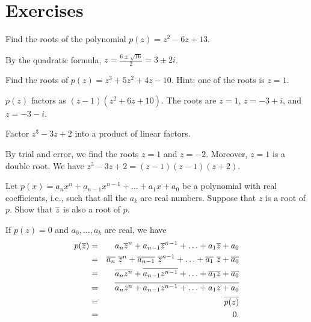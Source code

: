 \section*{Exercises}

\begin{ex}
  Find the roots of the polynomial $p(z) = z^2-6z+13$.
  \begin{sol}
    By the quadratic formula, $\displaystyle z=\frac{6\pm\sqrt{16}}{2}
      = 3\pm 2i$.
  \end{sol}
\end{ex}

\begin{ex}
  Find the roots of $p(z) = z^3 + 5z^2 + 4z - 10$. Hint: one of the
  roots is $z=1$.
  \begin{sol}
    $p(z)$ factors as $(z-1)(z^2+6z+10)$. The roots are $z=1$,
    $z=-3+i$, and $z=-3-i$.
  \end{sol}
\end{ex}

\begin{ex}
  Factor $z^3 - 3z + 2$ into a product of linear factors.
  \begin{sol}
    By trial and error, we find the roots $z=1$ and $z=-2$. Moreover,
    $z=1$ is a double root. We have $z^3 - 3z + 2 = (z-1)(z-1)(z+2)$.
  \end{sol}
\end{ex}

\begin{ex}
  Let $p(x) =a_{n}x^n+a_{n-1}x^{n-1}+\ldots+a_{1}x+a_{0}$ be a
  polynomial with real coefficients, i.e., such that all the $a_{k}$
  are real numbers. Suppose that $z$ is a root of $p$. Show that
  $\overline{z}$ is also a root of $p$.
  \begin{sol}
    If $p(z) =0$ and $a_0,\ldots,a_k$ are real, we have
    \begin{eqnarray*}
      p(\overline{z})
      &=& a_{n}\overline{z}^n+a_{n-1}\overline{z}^{n-1}+\ldots +a_{1}\overline{z}
          +a_{0} \\
      &=&\overline{a_{n}}\ \overline{z}^n+\overline{a_{n-1}}
          \ \overline{z}^{n-1}+\ldots +\overline{a_{1}}
          \ \overline{z}+\overline{a_{0}}
      \\
      &=& \overline{a_{n}z^n}+\overline{a_{n-1}z^{n-1}}+\ldots +\overline{a_{1}z}+
          \overline{a_{0}} \\
      &=& \overline{a_{n}z^n+a_{n-1}z^{n-1}+\ldots+a_{1}z+a_{0}} \\
      &=& \overline{p(z) } \\
      &=& 0.
    \end{eqnarray*}
  \end{sol}
\end{ex}

